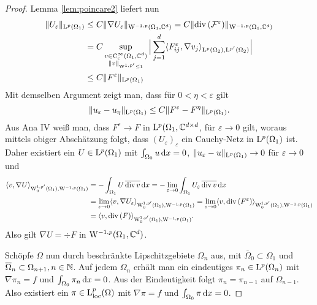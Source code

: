 \begin{proof}
  Lemma \ref{lem:poincare2} liefert nun
  \begin{align*}
  \| U_\varepsilon\|_{\mathrm{L}^p(\Omega_1)} 
  &\leq C \|\nabla U_\varepsilon\|_{\mathrm{W}^{-1,p}(\Omega_1, \mathbb{C}^d)} 
    = C \| \mathrm{div\,} (\mathcal{F}^\varepsilon)\|_{\mathrm{W}^{-1,p}(\Omega_1,\mathbb{C}^d)} \\
    &= C \sup_{\substack{v \in \mathrm{C}_{\mathrm{c}}^\infty(\Omega_1, \mathbb{C}^d) \\ \|v\|_{\mathrm{W}^{1,p'} \leq 1}}} \Big| \sum_{j = 1}^d \langle F_{ij}^\varepsilon, \nabla v_j \rangle_{\mathrm{L}^p(\Omega_2), \mathrm{L}^{p'}(\Omega_2)} \Big| \\
    &\leq C \|F^\varepsilon\|_{\mathrm{L}^p(\Omega_1)}
  \end{align*}
  Mit demselben Argument zeigt man, dass für $0< \eta < \varepsilon$ gilt
  $$
  \|u_\varepsilon - u_\eta \|_{\mathrm{L}^p(\Omega_1)} \leq C \| F^\varepsilon - F^\eta\|_{\mathrm{L}^p(\Omega_1)}.
  $$
  Aus Ana IV weiß man, dass $F^\varepsilon \to F$ in $\mathrm{L}^p(\Omega_1, \mathbb{C}^{d\times d}$, für $\varepsilon \to 0$ gilt, woraus mittels obiger Abschätzung folgt, dass $(U_\varepsilon)_\varepsilon$ ein Cauchy-Netz in $\mathrm{L}^p(\Omega_1)$ ist.
  Daher existiert ein $U \in \mathrm{L}^p(\Omega_1)$ mit $\int_{\Omega_0} u \, {\operatorname{d}\!{x}} = 0$, $\|u_\varepsilon - u\|_{\mathrm{L}^p(\Omega_1)} \to 0$ für $\varepsilon \to 0$ und
  \begin{align*}
    \langle v, \nabla U \rangle_{\mathrm{W}_0^{1,p'}(\Omega_1), \mathrm{W}^{-1,p}(\Omega_1)}
    &= - \int_{\Omega_1} U \, \overline{\mathrm{div\,} v } \, {\operatorname{d}\!{x}}
    = - \lim_{\varepsilon \to 0} \int_{\Omega_1} U_\varepsilon \, \overline{\mathrm{div\,} v} \, {\operatorname{d}\!{x}} \\
    &= \lim_{\varepsilon \to 0} \langle v, \nabla U_\varepsilon \rangle_{\mathrm{W}_0^{1,p'}(\Omega_1), \mathrm{W}^{-1, p}(\Omega_1)}
    = \lim_{\varepsilon \to 0} \langle v, \mathrm{div\,} (F^\varepsilon) \rangle_{\mathrm{W}_0^{1,p'}(\Omega_1), \mathrm{W}^{-1, p}(\Omega_1)} \\
     &= \langle v, \mathrm{div\,} (F) \rangle_{\mathrm{W}_0^{1,p'}(\Omega_1), \mathrm{W}^{-1, p}(\Omega_1)}.
  \end{align*}
  Also gilt $\nabla U = \div F$ in $\mathrm{W}^{-1,p}(\Omega_1, \mathbb{C}^d)$.
  
  Schöpfe $\Omega$ nun durch beschränkte Lipschitzgebiete $\Omega_n$ aus, mit $\overline\Omega_0 \subset \Omega_1$ und $\overline\Omega_n \subset \Omega_{n + 1}, n \in \mathbb{N}$.
  Auf jedem $\Omega_n$ erhält man ein eindeutiges $\pi_n \in \mathrm{L}^p(\Omega_n)$ mit $\nabla \pi_n = f$ und $\int_{\Omega_0} \pi_n \, {\operatorname{d}\!{x}} = 0$.
  Aus der Eindeutigkeit folgt $\pi_n = \pi_{n -1}$ auf $\Omega_{n - 1}$.
  Also existiert ein $\pi \in \mathrm{L}^p_{\operatorname{loc}}(\Omega)$ mit $\nabla\pi = f$ und $\int_{\Omega_0} \pi \, {\operatorname{d}\!{x}} = 0$.
\end{proof}

